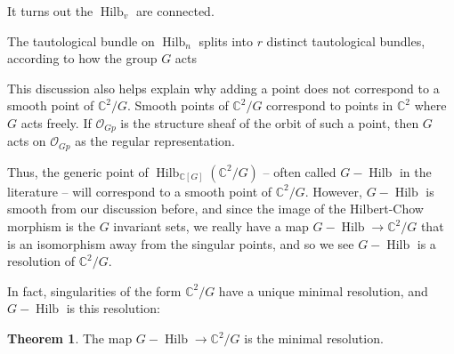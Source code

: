 \documentclass{amsart}[12pt]
\theoremstyle{definition}
\newtheorem{theorem}[dummy]{Theorem}
\newcommand{\C}{\mathbb{C}}
\DeclareMathOperator{\Hilb}{Hilb}
\begin{document}
It turns out the $\Hilb_v$ are connected.  

The tautological bundle on $\Hilb_n$ splits into $r$ distinct tautological bundles, according to how the group $G$ acts 


This discussion also helps explain why adding a point does not correspond to a smooth point of $\C^2/G$.  Smooth points of $\C^2/G$ correspond to points in $\C^2$ where $G$ acts freely.  If $\mathcal{O}_{Gp}$ is the structure sheaf of the orbit of such a point, then $G$ acts on $\mathcal{O}_{Gp}$ as the regular representation.  

Thus, the generic point of $\Hilb_{\C[G]}({\C^2/G})$ -- often called $G-\Hilb$ in the literature -- will correspond to a smooth point of $\C^2/G$.  However, $G-\Hilb$ is smooth from our discussion before, and since the image of the Hilbert-Chow morphism is the $G$ invariant sets, we really have a map $G-\Hilb\to \C^2/G$ that is an isomorphism away from the singular points, and so we see $G-\Hilb$ is a resolution of $\C^2/G$. 

\begin{center}
\end{center}

In fact, singularities of the form $\C^2/G$ have a unique minimal resolution, and $G-\Hilb$ is this resolution:





\begin{theorem} \label{thm:GHilb-resolution}
The map $G-\Hilb\to \C^2/G$ is the minimal resolution.
\end{theorem}
\end{document}
